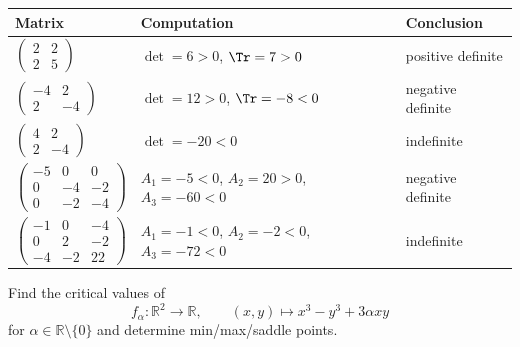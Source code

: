 \begin{example}
\begin{center}
\begin{tabular}{lll}
\textbf{Matrix} & \textbf{Computation} & \textbf{Conclusion} \\
\hline
$\left(\begin{smallmatrix}2&2\\2&5\end{smallmatrix}\right)$ & $\det = 6 > 0$, $\Tr = 7 > 0$ & positive definite \\
$\left(\begin{smallmatrix}-4&2\\2&-4\end{smallmatrix}\right)$ & $\det = 12 > 0$, $\Tr = -8 < 0$ & negative definite \\
$\left(\begin{smallmatrix}4&2\\2&-4\end{smallmatrix}\right)$ & $\det = -20 < 0$ & indefinite \\
$\left(\begin{smallmatrix}-5&0&0\\0&-4&-2\\0&-2&-4\end{smallmatrix}\right)$ & $A_1 = -5 < 0$, $A_2 = 20 > 0$, $A_3 = -60 < 0$ & negative definite \\
$\left(\begin{smallmatrix}-1&0&-4\\0&2&-2\\-4&-2&22\end{smallmatrix}\right)$ & $A_1 = -1 < 0$, $A_2 = -2 < 0$, $A_3 = -72 < 0$ & indefinite \\
\end{tabular}
\end{center}
\end{example}

\begin{exercise}
\label{ex:cubic_saddle_family}
Find the critical values of
\[f_\alpha : \mathbb{R}^2 \to \mathbb{R}, \qquad (x,y) \mapsto x^3 - y^3 + 3\alpha xy\]
for $\alpha \in \mathbb{R}\setminus\{0\}$ and determine min/max/saddle points.
\end{exercise}

